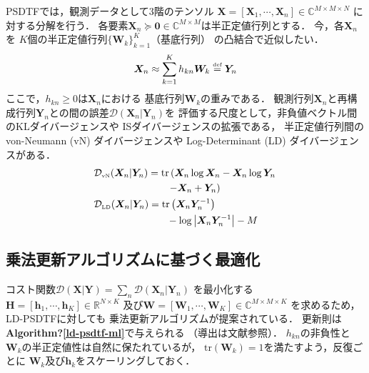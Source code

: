 PSDTFでは，観測データとして3階のテンソル
$\bm{X} = [\bm{X}_1,\cdots,\bm{X}_n] \in \mathbb{C}^{M \times M \times N}$
に対する分解を行う．
各要素$\bm{X}_n \succeq \bm{0} \in \mathbb{C}^{M \times M}$は半正定値行列とする．
今，各$\bm{X}_n$を
$K$個の半正定値行列$\{\bm{W}_k\}_{k=1}^{K}$（基底行列）
の凸結合で近似したい．
\begin{align}
 \bm{X}_{n} \approx 
  \sum_{k=1}^{K} h_{kn} \bm{W}_k
  \overset{\mbox{\tiny def}}{=} \bm{Y}_n
 \label{eqn:x_n_psdtf}
\end{align}
ここで，$h_{kn} \ge 0$は$\bm{X}_n$における
基底行列$\bm{W}_k$の重みである．
観測行列$\bm{X}_n$と再構成行列$\bm{Y}_n$との間の誤差$\mathcal{D}(\bm{X}_n|\bm{Y}_n)$を
評価する尺度として，非負値ベクトル間のKLダイバージェンスや
ISダイバージェンスの拡張である，
半正定値行列間のvon-Neumann (vN) ダイバージェンスや
Log-Determinant (LD) ダイバージェンスがある\cite{kulis:jmlr:2009}．
\begin{align}
 &
 \mathcal{D}_{\mbox{\tiny vN}}(\bm{X}_n|\bm{Y}_n)
 = \mbox{tr}\left(\bm{X}_n \log \bm{X}_n - \bm{X}_n \log \bm{Y}_n\right.
 \nonumber\\
 & \ \ \ \ \ \ \ \ \ \ \ \ \ \ \ \ \ \ \ \ \ \
 \left.- \bm{X}_n + \bm{Y}_n\right)
 \label{eqn:psdtf_vn}\\
 &
 \mathcal{D}_{\mbox{\tiny LD}}(\bm{X}_n|\bm{Y}_n)
 = \mbox{tr}\left(\bm{X}_n \bm{Y}_n^{-1}\right)
 \nonumber\\
 & \ \ \ \ \ \ \ \ \ \ \ \ \ \ \ \ \ \ \ \ \ \
 - \log\left|\bm{X}_n \bm{Y}_n^{-1}\right|
 - M
 \label{eqn:psdtf_ld}
\end{align}

\subsection{乗法更新アルゴリズムに基づく最適化}
\label{sec:psdtf_mu}

コスト関数$\mathcal{D}(\bm{X}|\bm{Y})
 =\sum_n \mathcal{D}(\bm{X}_n|\bm{Y}_n)$
を最小化する
$\bm{H} = [\bm{h}_1,\cdots,\bm{h}_K] \in \mathbb{R}^{N \times K}$
及び$\bm{W} = [\bm{W}_1,\cdots,\bm{W}_K] \in \mathbb{C}^{M \times M \times K}$
を求めるため，LD-PSDTFに対しても%
乗法更新アルゴリズム\cite{yoshii:ismir:2013,yoshii:icml:2013}が提案されている．
更新則は{\bf Algorithm?\ref{ld-psdtf-ml}}で与えられる
（導出は文献\cite{yoshii:ismir:2013,yoshii:icml:2013}参照）．
$h_{kn}$の非負性と
$\bm{W}_k$の半正定値性は自然に保たれているが，
$\mbox{tr}(\bm{W}_k)=1$を満たすよう，反復ごとに
$\bm{W}_k$及び$\bm{h}_k$をスケーリングしておく．

